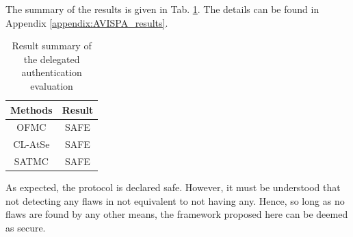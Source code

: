 The summary of the results is given in Tab. \ref{tab:result_2}. The details can be found in Appendix \ref{appendix:AVISPA_results}.

\begin{table}[!t]
		\centering
		\caption{Result summary of the delegated authentication evaluation}
		\label{tab:result_2}
		\begin{tabular}{|c|c|}
			\hline Methods &  Result\\ 
			\hline OFMC & SAFE \\ 
			\hline CL-AtSe & SAFE \\ 
			\hline SATMC & SAFE \\ 
			\hline 
		\end{tabular} 
\end{table}


As expected, the protocol is declared safe. However, it must be understood that not detecting any flaws in not equivalent to not having any. Hence, so long as no flaws are found by any other means, the framework proposed here can be deemed as secure.





